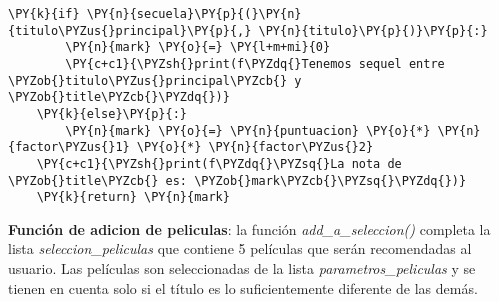 \begin{tcolorbox}[breakable, size=fbox, boxrule=1pt, pad at break*=1mm,colback=cellbackground, colframe=cellborder]
\begin{Verbatim}[commandchars=\\\{\}]
    \PY{k}{if} \PY{n}{secuela}\PY{p}{(}\PY{n}{titulo\PYZus{}principal}\PY{p}{,} \PY{n}{titulo}\PY{p}{)}\PY{p}{:}
        \PY{n}{mark} \PY{o}{=} \PY{l+m+mi}{0}
        \PY{c+c1}{\PYZsh{}print(f\PYZdq{}Tenemos sequel entre \PYZob{}titulo\PYZus{}principal\PYZcb{} y \PYZob{}title\PYZcb{}\PYZdq{})}
    \PY{k}{else}\PY{p}{:}
        \PY{n}{mark} \PY{o}{=} \PY{n}{puntuacion} \PY{o}{*} \PY{n}{factor\PYZus{}1} \PY{o}{*} \PY{n}{factor\PYZus{}2}
    \PY{c+c1}{\PYZsh{}print(f\PYZdq{}\PYZsq{}La nota de \PYZob{}title\PYZcb{} es: \PYZob{}mark\PYZcb{}\PYZsq{}\PYZdq{})}
    \PY{k}{return} \PY{n}{mark}
\end{Verbatim}
\end{tcolorbox}

    \textbf{Función de adicion de peliculas}: la función
\emph{add\_a\_seleccion()} completa la lista \emph{seleccion\_peliculas}
que contiene 5 películas que serán recomendadas al usuario. Las
películas son seleccionadas de la lista \emph{parametros\_peliculas} y
se tienen en cuenta solo si el título es lo suficientemente diferente de
las demás.

